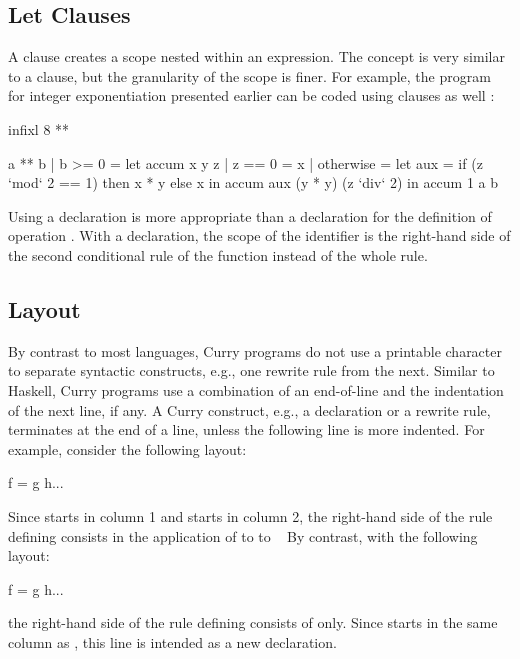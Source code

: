 \subsection{{\selectfont Let} Clauses}
\label{let-clause}

A 
clause creates a scope nested within an expression.
The concept is very similar to a  clause,
but the granularity of the scope is finer.
For example, the program for integer exponentiation
presented earlier can be coded using  clauses
as well
:
%
\begin{curry}
infixl 8 **

a ** b | b >= 0 = 
  let accum x y z | z == 0    = x
                  | otherwise =
                       let aux = if (z `mod` 2 == 1) then x * y else x
                       in  accum aux (y * y) (z `div` 2)
  in  accum 1 a b
\end{curry}
%
Using a  declaration is more appropriate than a
 declaration for the definition of operation .
With a  declaration, the scope of the identifier 
is the right-hand side of the second conditional rule of
the function  instead of the whole rule.

\subsection{Layout}
\label{sec-layout}

By contrast to most languages,
Curry programs do not use a printable character to separate
syntactic constructs, e.g., one rewrite rule from the next.
Similar to Haskell,
Curry programs use a combination of an end-of-line and
the indentation of the next line, if any.
A Curry construct, e.g., a  declaration or a rewrite rule,
terminates at the end of a line, unless the following line
is more indented.
For example, consider the following layout:
%
\begin{curry}
f = g
 h...
\end{curry}
%
Since  starts in column 1 and  starts in column 2,
the right-hand side of the rule defining  consists in
the application of  to  to \ %
By contrast, with the following layout:
%
\begin{curry}
f = g
h...
\end{curry}
%
the right-hand side of the rule defining  consists of
 only.
Since  starts in the same column as  ,
this line is intended as a new declaration.

